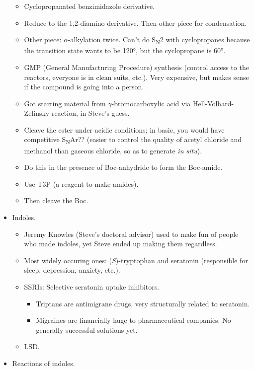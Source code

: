 \documentclass[../notes.tex]{subfiles}
\begin{document}
\begin{itemize}
\begin{itemize}
        \item Cyclopropanated benzimidazole derivative.
        \item Reduce to the 1,2-diamino derivative. Then other piece for condensation.
        \item Other piece: $\alpha$-alkylation twice. Can't do S\textsubscript{N}2 with cyclopropanes because the transition state wants to be \ang{120}, but the cyclopropane is \ang{60}.
        \item GMP (General Manufacturing Procedure) synthesis (control access to the reactors, everyone is in clean suits, etc.). Very expensive, but makes sense if the compound is going into a person.
        \item Got starting material from $\gamma$-bromocarboxylic acid via Hell-Volhard-Zelinsky reaction, in Steve's guess.
        \item Cleave the ester under acidic conditions; in basic, you would have competitive S\textsubscript{N}Ar?? (easier to control the quality of acetyl chloride and methanol than gaseous chloride, so as to generate  \emph{in situ}).
        \item Do this in the presence of Boc-anhydride to form the Boc-amide.
        \item Use T3P (a reagent to make amides).
        \item Then cleave the Boc.
    \end{itemize}
    \item Indoles.
    \begin{itemize}
        \item Jeremy Knowles (Steve's doctoral advisor) used to make fun of people who made indoles, yet Steve ended up making them regardless.
        \item Most widely occuring ones: (\emph{S})-tryptophan and seratonin (responsible for sleep, depression, anxiety, etc.).
        \item SSRIs: Selective seratonin uptake inhibitors.
        \begin{itemize}
            \item Triptans are antimigrane drugs, very structurally related to seratonin.
            \item Migraines are financially huge to pharmaceutical companies. No generally successful solutions yet.
        \end{itemize}
        \item LSD.
    \end{itemize}
    \item Reactions of indoles.

\end{itemize}
\end{document}
